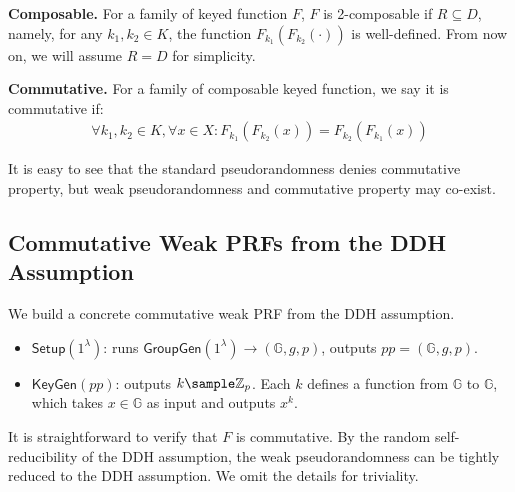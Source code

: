\begin{trivlist}
\item \textbf{Composable.} For a family of keyed function $F$, $F$ is 2-composable if $R \subseteq D$, 
    namely, for any $k_1, k_2 \in K$, the function $F_{k_1}(F_{k_2}(\cdot))$ is well-defined. 
    From now on, we will assume $R = D$ for simplicity.   

\item \textbf{Commutative.} For a family of composable keyed function, we say it is commutative if:  
\begin{gather*}
    \forall k_1, k_2 \in K, \forall x \in X: F_{k_1}(F_{k_2}(x)) = F_{k_2}(F_{k_1}(x))
\end{gather*}
\end{trivlist}

It is easy to see that the standard pseudorandomness denies commutative property, 
but weak pseudorandomness and commutative property may co-exist.

\subsection{Commutative Weak PRFs from the DDH Assumption}
We build a concrete commutative weak PRF from the DDH assumption. 
\begin{itemize}
\item $\mathsf{Setup}(1^\lambda)$: runs $\mathsf{GroupGen}(1^\lambda) \rightarrow (\mathbb{G}, g, p)$, 
    outputs $pp = (\mathbb{G}, g, p)$. 

\item $\mathsf{KeyGen}(pp)$: outputs $k \sample \mathbb{Z}_p$. 
    Each $k$ defines a function from $\mathbb{G}$ to $\mathbb{G}$, 
    which takes $x \in \mathbb{G}$ as input and outputs $x^k$. 
\end{itemize}
It is straightforward to verify that $F$ is commutative. 
By the random self-reducibility of the DDH assumption, 
the weak pseudorandomness can be tightly reduced to the DDH assumption. 
We omit the details for triviality. 

